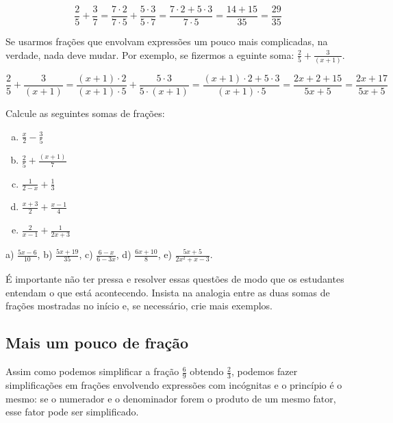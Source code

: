 \documentclass[main_estudante.tex]{subfiles}
\begin{document}
$$
\frac{2}{5} + \frac{3}{7} = \frac{7 \cdot 2}{7 \cdot 5} + \frac{5 \cdot 3}{5 \cdot 7} = \frac{7 \cdot 2 + 5 \cdot 3}{7 \cdot 5} = \frac{14 + 15}{35} = \frac{29}{35}
$$

Se usarmos frações que envolvam expressões um pouco mais complicadas, na verdade, nada deve mudar. Por exemplo, se fizermos a eguinte soma: $\frac{2}{5}+\frac{3}{(x+1)}$.

$$
\frac{2}{5} + \frac{3}{(x+1)} = \frac{(x+1) \cdot 2}{(x+1) \cdot 5} + \frac{5 \cdot 3}{5 \cdot (x+1)} = \frac{(x+1) \cdot 2 + 5 \cdot 3}{(x+1) \cdot 5} = \frac{2x+2+15}{5x+5} = \frac{2x+17}{5x+5}
$$

\begin{questao}
Calcule as seguintes somas de frações:
\begin{enumerate}[a)]
\item $\frac{x}{2}-\frac{3}{5}$
\item $\frac{2}{5}+\frac{(x+1)}{7}$
\item $\frac{1}{2-x}+\frac{1}{3}$
\item $\frac{x+3}{2}+\frac{x-1}{4}$
\item $\frac{2}{x-1}+\frac{1}{2x+3}$
\end{enumerate}
\end{questao}

\begin{gabarito}
	\begin{gabaritoQuestao}
		a) $\frac{5x-6}{10}$, b) $\frac{5x+19}{35}$, c) $\frac{6-x}{6-3x}$, d) $\frac{6x+10}{8}$, e) $\frac{5x+5}{2x^2+x-3}$.
	\end{gabaritoQuestao}
\end{gabarito}

\paraTutores

É importante não ter pressa e resolver essas questões de modo que os estudantes entendam o que está acontecendo. Insista na analogia entre as duas somas de frações mostradas no início e, se necessário, crie mais exemplos.

\paraAmbos

\subsection*{Mais um pouco de fração}

Assim como podemos simplificar a fração $\frac{6}{9}$ obtendo $\frac{2}{3}$, podemos fazer simplificações em frações envolvendo expressões com incógnitas e o princípio é o mesmo: se o numerador e o denominador forem o produto de um mesmo fator, esse fator pode ser simplificado.
\end{document}
